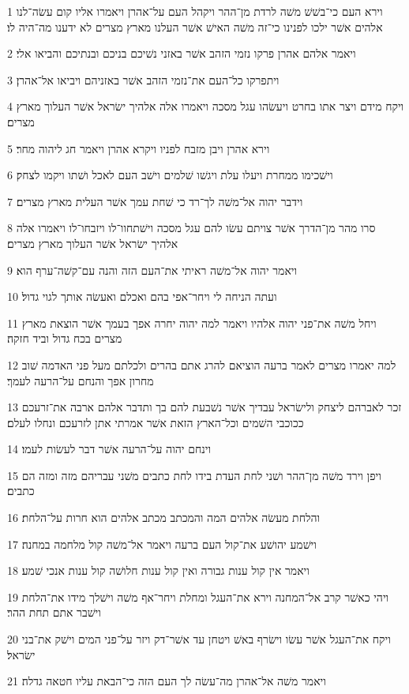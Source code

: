 \par 1 וירא העם כי־בשׁשׁ משׁה לרדת מן־ההר ויקהל העם על־אהרן ויאמרו אליו קום עשׂה־לנו אלהים אשׁר ילכו לפנינו כי־זה משׁה האישׁ אשׁר העלנו מארץ מצרים לא ידענו מה־היה לו׃
\par 2 ויאמר אלהם אהרן פרקו נזמי הזהב אשׁר באזני נשׁיכם בניכם ובנתיכם והביאו אלי׃
\par 3 ויתפרקו כל־העם את־נזמי הזהב אשׁר באזניהם ויביאו אל־אהרן׃
\par 4 ויקח מידם ויצר אתו בחרט ויעשׂהו עגל מסכה ויאמרו אלה אלהיך ישׂראל אשׁר העלוך מארץ מצרים׃
\par 5 וירא אהרן ויבן מזבח לפניו ויקרא אהרן ויאמר חג ליהוה מחר׃
\par 6 וישׁכימו ממחרת ויעלו עלת ויגשׁו שׁלמים וישׁב העם לאכל ושׁתו ויקמו לצחק׃
\par 7 וידבר יהוה אל־משׁה לך־רד כי שׁחת עמך אשׁר העלית מארץ מצרים׃
\par 8 סרו מהר מן־הדרך אשׁר צויתם עשׂו להם עגל מסכה וישׁתחוו־לו ויזבחו־לו ויאמרו אלה אלהיך ישׂראל אשׁר העלוך מארץ מצרים׃
\par 9 ויאמר יהוה אל־משׁה ראיתי את־העם הזה והנה עם־קשׁה־ערף הוא׃
\par 10 ועתה הניחה לי ויחר־אפי בהם ואכלם ואעשׂה אותך לגוי גדול׃
\par 11 ויחל משׁה את־פני יהוה אלהיו ויאמר למה יהוה יחרה אפך בעמך אשׁר הוצאת מארץ מצרים בכח גדול וביד חזקה׃
\par 12 למה יאמרו מצרים לאמר ברעה הוציאם להרג אתם בהרים ולכלתם מעל פני האדמה שׁוב מחרון אפך והנחם על־הרעה לעמך׃
\par 13 זכר לאברהם ליצחק ולישׂראל עבדיך אשׁר נשׁבעת להם בך ותדבר אלהם ארבה את־זרעכם ככוכבי השׁמים וכל־הארץ הזאת אשׁר אמרתי אתן לזרעכם ונחלו לעלם׃
\par 14 וינחם יהוה על־הרעה אשׁר דבר לעשׂות לעמו׃
\par 15 ויפן וירד משׁה מן־ההר ושׁני לחת העדת בידו לחת כתבים משׁני עבריהם מזה ומזה הם כתבים׃
\par 16 והלחת מעשׂה אלהים המה והמכתב מכתב אלהים הוא חרות על־הלחת׃
\par 17 וישׁמע יהושׁע את־קול העם ברעה ויאמר אל־משׁה קול מלחמה במחנה׃
\par 18 ויאמר אין קול ענות גבורה ואין קול ענות חלושׁה קול ענות אנכי שׁמע׃
\par 19 ויהי כאשׁר קרב אל־המחנה וירא את־העגל ומחלת ויחר־אף משׁה וישׁלך מידו את־הלחת וישׁבר אתם תחת ההר׃
\par 20 ויקח את־העגל אשׁר עשׂו וישׂרף באשׁ ויטחן עד אשׁר־דק ויזר על־פני המים וישׁק את־בני ישׂראל׃
\par 21 ויאמר משׁה אל־אהרן מה־עשׂה לך העם הזה כי־הבאת עליו חטאה גדלה׃
